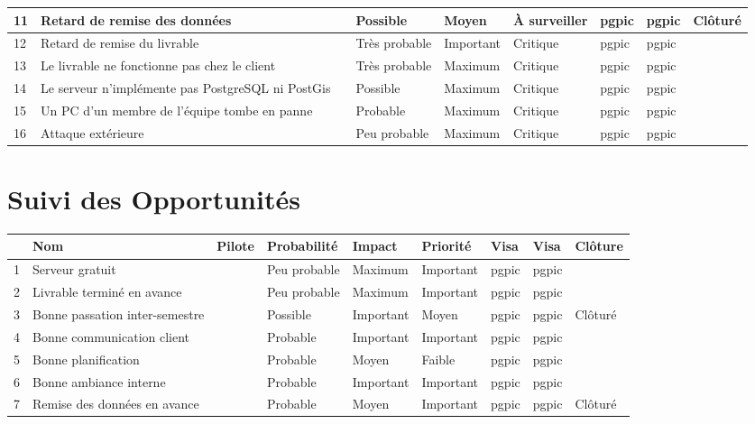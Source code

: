 \documentclass[asi]{picInsa}
\begin{document}
\begin{longtable}{|p{0.3cm}|p{2.5cm}|p{2cm}|p{2cm}|p{1.8cm}|p{1.5cm}|p{1cm}|p{1cm}|p{1.5cm}|}
			 11 & Retard de remise des données & \Sergi & Possible & Moyen & À surveiller & pgpic & pgpic & Clôturé \\\hline
			 
			 12 & Retard de remise du livrable & \Kafui & Très probable & Important & Critique & pgpic & pgpic & \\\hline
			 
			 13 & Le livrable ne fonctionne pas chez le client & \Melissa & Très probable & Maximum & Critique & pgpic & pgpic & \\\hline
			 
			 14 & Le serveur n’implémente pas PostgreSQL ni PostGis & \Pierre & Possible & Maximum & Critique & pgpic & pgpic & \\\hline
			 
			 15 & Un PC d'un membre de l'équipe tombe en panne & \Francois & Probable & Maximum & Critique & pgpic & pgpic & \\\hline

			 16 & Attaque extérieure & \Florian & Peu probable & Maximum & Critique & pgpic & pgpic & \\\hline
			 
			 
\end{longtable}

\chapter*{Suivi des Opportunités}

\begin{longtable}{|p{0.3cm}|p{2.5cm}|p{2cm}|p{2cm}|p{1.8cm}|p{1.8cm}|p{1cm}|p{1cm}|p{1.5cm}|}
			\hline
			\rowcolor{gray!40}
			\No & Nom & Pilote & Probabilité & Impact & Priorité & Visa \RQCourt{} & Visa \CPCourt{} & Clôture \\\hline
			 1 & Serveur gratuit & \Matthieu & Peu probable & Maximum & Important & pgpic & pgpic & \\\hline
			 2 & Livrable terminé en avance & \Kafui & Peu probable & Maximum & Important & pgpic & pgpic & \\\hline
			 3 & Bonne passation inter-semestre & \Francois & Possible & Important & Moyen & pgpic & pgpic & Clôturé \\\hline
			 4 & Bonne communication client & \Florian & Probable & Important & Important & pgpic & pgpic & \\\hline
			 5 & Bonne planification & \Pierre & Probable & Moyen & Faible & pgpic & pgpic & \\\hline
			 6 & Bonne ambiance interne & \Pierre & Probable & Important & Important & pgpic & pgpic & \\\hline
			 7 & Remise des données en avance & \Sergi & Probable & Moyen & Important & pgpic & pgpic & Clôturé \\\hline
\end{longtable}
\end{document}
